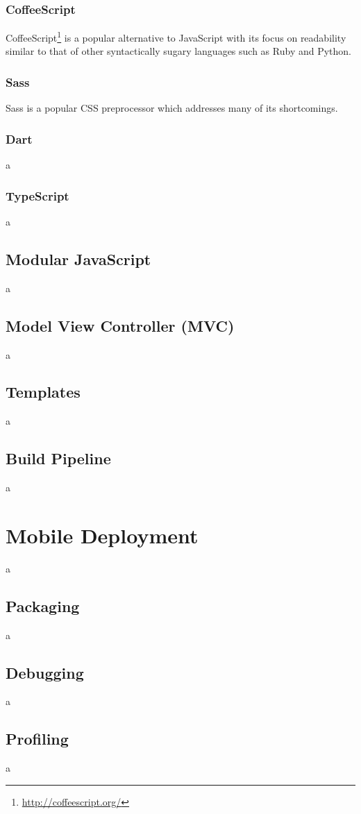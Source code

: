 \documentclass[final]{cmpreport}
\begin{document}
\subsubsection{CoffeeScript}
CoffeeScript\footnote{\url{http://coffeescript.org/}} is a popular alternative to JavaScript with its focus on readability similar to that of other syntactically sugary \cite{ESR} languages such as Ruby and Python.

\subsubsection{Sass}
Sass is a popular CSS preprocessor which addresses many of its shortcomings.

\subsubsection{Dart}
a

\subsubsection{TypeScript}
a

\subsection{Modular JavaScript}
a

\subsection{Model View Controller (MVC)}
a

\subsection{Templates}
a

\subsection{Build Pipeline}
a

\section{Mobile Deployment}
a

\subsection{Packaging}
a

\subsection{Debugging}
a

\subsection{Profiling}
a


\clearpage

\end{document}
